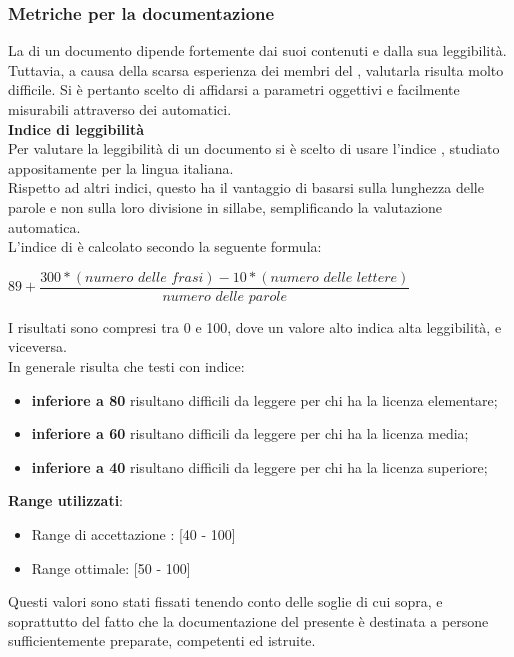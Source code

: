 \subsubsection{Metriche per la documentazione}\label{MetricheDoc}
\hypertarget{metriche_documenti}{}
La  di un documento dipende fortemente dai suoi contenuti e dalla sua leggibilità. Tuttavia, a causa della scarsa esperienza dei membri del , valutarla risulta molto difficile. Si è pertanto scelto di affidarsi a parametri oggettivi e facilmente misurabili attraverso dei  automatici.\\

\textbf{Indice di leggibilità}\\

Per valutare la leggibilità di un documento si è scelto di usare l'indice , studiato appositamente per la lingua italiana.\\
Rispetto ad altri indici, questo ha il vantaggio di basarsi sulla lunghezza delle parole e non sulla loro divisione in sillabe, semplificando la valutazione automatica.\\
L'indice di  è calcolato secondo la seguente formula:
\begin{center}
\begin{math}
	89 + 
		\dfrac	{300 * (\textit{numero delle frasi}) - 10 * (\textit{numero delle lettere})}
				{\textit{numero delle parole}}
\end{math}
\end{center}
I risultati sono compresi tra 0 e 100, dove un valore alto indica alta leggibilità, e viceversa. \\
In generale risulta che testi con indice:
\begin{itemize}
	\item \textbf{inferiore a 80} risultano difficili da leggere per chi ha la licenza elementare;
	\item \textbf{inferiore a 60} risultano difficili da leggere per chi ha la licenza media;
	\item \textbf{inferiore a 40} risultano difficili da leggere per chi ha la licenza superiore;
\end{itemize}
\textbf{Range utilizzati}:
\begin{itemize}
	\item Range di accettazione : [40 - 100]
	\item Range ottimale: [50 - 100]
\end{itemize}
Questi valori sono stati fissati tenendo conto delle soglie di cui sopra, e soprattutto del fatto che la documentazione del presente  è destinata a persone sufficientemente preparate, competenti ed istruite.

